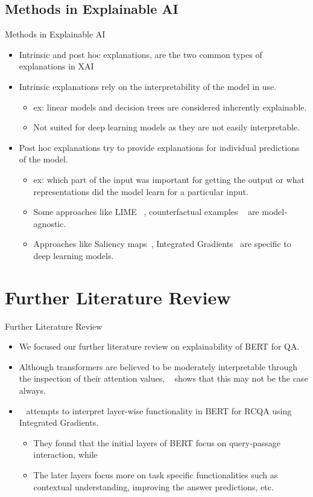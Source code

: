 \documentclass[10pt]{beamer}
\begin{document}
\subsection{Methods in Explainable AI}
\begin{frame}{Methods in Explainable AI}
\begin{itemize}
    \item Intrinsic and post hoc explanations, are the two common types of explanations in XAI
    \item Intrinsic explanations rely on the interpretability of the model in use.
    \begin{itemize}
    \item ex: linear models and decision trees are considered inherently explainable. 
    \item Not suited for deep learning models as they are not easily interpretable.
    \end{itemize}
    \item Post hoc explanations try to provide explanations for individual predictions of the model.
    \begin{itemize}
    \item ex: which part of the input was important for getting the output or what representations did the model learn for a particular input. 
    \item Some approaches like LIME ~\cite{lime}, counterfactual examples ~\cite{counterfactual} are model-agnostic.
    \item Approaches like Saliency maps~\cite{Saliency}, Integrated Gradients~\cite{IG} are specific to deep learning models.
    \end{itemize}
\end{itemize}
\end{frame}

\section{Further Literature Review}
\begin{frame}{Further Literature Review}
\begin{itemize}
    \item We focused our further literature review on explainability of BERT for QA.
    \item Although transformers are believed to be moderately interpretable through the inspection of their attention values, ~\cite{at_not_exp} shows that this may not be the case always.
    \item ~\cite{bert_for_qa} attempts to interpret layer-wise functionality in BERT for RCQA using Integrated Gradients.
    \begin{itemize}
        \item They found that the initial layers of BERT focus on query-passage interaction, while 
        \item The later layers focus more on task specific functionalities such as contextual understanding, improving the answer predictions, etc.
    \end{itemize}
\end{itemize}
\end{frame}
\end{document}
